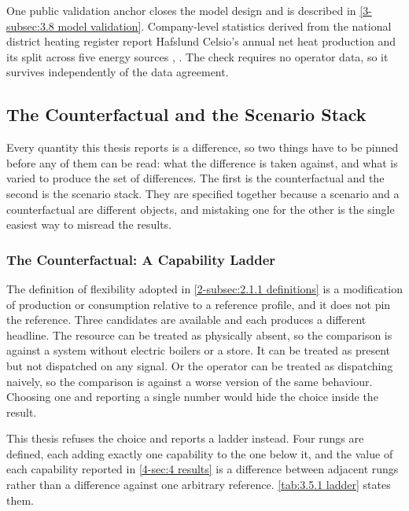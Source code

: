 One public validation anchor closes the model design and is described in \autoref{3-subsec:3.8 model validation}. Company-level statistics derived from the national district heating register report Hafslund Celsio's annual net heat production and its split across five energy sources \cite{norsk_fjernvarme_fjernkontrollenno_nodate}, \cite{norsk_fjernvarme_fakta_nodate}. The check requires no operator data, so it survives independently of the data agreement.

\subsection{The Counterfactual and the Scenario Stack}
\label{3-subsec:3.5 counterfactual and stack}

Every quantity this thesis reports is a difference, so two things have to be pinned before any of them can be read: what the difference is taken against, and what is varied to produce the set of differences. The first is the counterfactual and the second is the scenario stack. They are specified together because a scenario and a counterfactual are different objects, and mistaking one for the other is the single easiest way to misread the results.

\subsubsection{The Counterfactual: A Capability Ladder}
\label{3-subsec:3.5.1 ladder}

The definition of flexibility adopted in \autoref{2-subsec:2.1.1 definitions} is a modification of production or consumption relative to a reference profile, and it does not pin the reference. Three candidates are available and each produces a different headline. The resource can be treated as physically absent, so the comparison is against a system without electric boilers or a store. It can be treated as present but not dispatched on any signal. Or the operator can be treated as dispatching naively, so the comparison is against a worse version of the same behaviour. Choosing one and reporting a single number would hide the choice inside the result.

This thesis refuses the choice and reports a ladder instead. Four rungs are defined, each adding exactly one capability to the one below it, and the value of each capability reported in \autoref{4-sec:4 results} is a difference between adjacent rungs rather than a difference against one arbitrary reference. \autoref{tab:3.5.1 ladder} states them.

